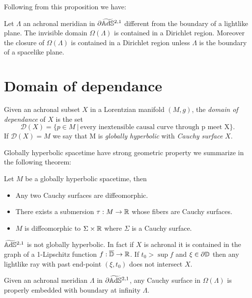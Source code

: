 Following from this proposition we have:
\begin{proposition} \label{prop:invisible2}
    Let $\Lambda$ an achronal meridian in $\partial\widetilde{\mathbb{A}\mathrm{d}\mathbb{S}}{}^{2,1}$ different from the boundary of a lightlike plane. The invisible domain $\Omega(\Lambda)$ is contained in a Dirichlet region. Moreover the closure of $\Omega(\Lambda)$ is contained in a Dirichlet region unless $\Lambda$ is the boundary of a spacelike plane.
\end{proposition}
\section{Domain of dependance}
\begin{definition}
    Given an achronal subset $X$ in a Lorentzian manifold $(M,g)$, the \textit{domain of dependance} of $X$ is the set
    \[
        \mathcal{D}(X)= \{ p \in M \ | \ \text{every inextensible causal curve through p meet X} \}.
    \]
    If $\mathcal{D}(X)=M$ we say that M is  \textit{globally hyperbolic} with \textit{Cauchy surface} $X$.
\end{definition}
Globally hyperbolic spacetime have strong geometric property we summarize in the following theorem:
\begin{theorem} \label{GH_structure}
    Let $M$ be a globally hyperbolic spacetime, then
    \begin{itemize}
        \item Any two Cauchy surfaces are diffeomorphic.
        \item There  exists a submersion $\tau : M \to \mathbb{R}$ whose fibers are Cauchy surfaces.
        \item $M$ is diffeomorphic to $\Sigma \times \mathbb{R}$ where $\Sigma$ is a Cauchy surface.
    \end{itemize}
\end{theorem}
\begin{observation}
    $\widetilde{\mathbb{A}\mathrm{d}\mathbb{S}}{}^{2,1}$ is not globally hyperbolic. In fact if $X$ is achronal it is contained in the graph of a 1-Lipschitz function $f: \overline{\mathbb{D}} \to \mathbb{R}$. If $t_0 > \sup f$ and $\xi \in \partial\mathbb{D}$ then any lightlike ray with past end-point $(\xi,t_0)$ does not intersect $X$.
\end{observation}
\begin{lemma}
    Given an achronal meridian $\Lambda$ in $\partial\widetilde{\mathbb{A}\mathrm{d}\mathbb{S}}{}^{2,1}$, any Cauchy surface in $\Omega(\Lambda)$ is properly embedded with boundary at infinity $\Lambda$.
\end{lemma}
